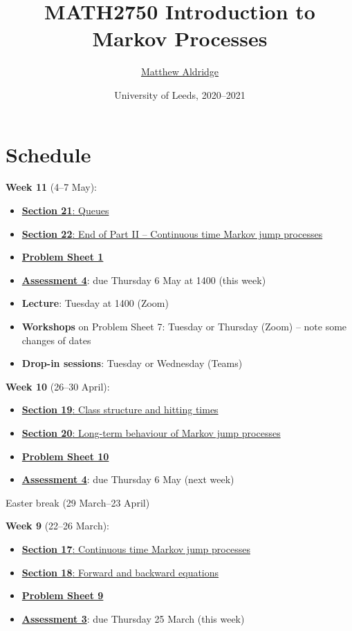 \documentclass[
  a4paper,
]{article}
\title{MATH2750 Introduction to Markov Processes}
\author{\href{mailto:m.aldridge@leeds.ac.uk}{Matthew Aldridge}}
\date{University of Leeds, 2020--2021}
\providecommand{\tightlist}{%
  \setlength{\itemsep}{0pt}\setlength{\parskip}{0pt}}
\theoremstyle{definition}
\theoremstyle{definition}
\theoremstyle{definition}
\theoremstyle{remark}
\begin{document}
\maketitle

{
\setcounter{tocdepth}{2}
\tableofcontents
}
\hypertarget{home}{%
\section*{Schedule}\label{home}}

\textbf{Week 11} (4--7 May):

\begin{itemize}
\tightlist
\item
  \protect\hyperlink{S21-queues}{\textbf{Section 21}: Queues}
\item
  \protect\hyperlink{S222-end}{\textbf{Section 22}: End of Part II -- Continuous time Markov jump processes}
\item
  \protect\hyperlink{P11}{\textbf{Problem Sheet 1}}
\item
  \protect\hyperlink{A4}{\textbf{Assessment 4}}: due Thursday 6 May at 1400 (this week)
\item
  \textbf{Lecture}: Tuesday at 1400 (Zoom)
\item
  \textbf{Workshops} on Problem Sheet 7: Tuesday or Thursday (Zoom) -- note some changes of dates
\item
  \textbf{Drop-in sessions}: Tuesday or Wednesday (Teams)
\end{itemize}

\textbf{Week 10} (26--30 April):

\begin{itemize}
\tightlist
\item
  \protect\hyperlink{S19-class-hitting}{\textbf{Section 19}: Class structure and hitting times}
\item
  \protect\hyperlink{S20-long-term-jump}{\textbf{Section 20}: Long-term behaviour of Markov jump processes}
\item
  \protect\hyperlink{P10}{\textbf{Problem Sheet 10}}
\item
  \protect\hyperlink{A4}{\textbf{Assessment 4}}: due Thursday 6 May (next week)
\end{itemize}

Easter break (29 March--23 April)

\textbf{Week 9} (22--26 March):

\begin{itemize}
\tightlist
\item
  \protect\hyperlink{S17-continuous-time}{\textbf{Section 17}: Continuous time Markov jump processes}
\item
  \protect\hyperlink{S18-forward-backward}{\textbf{Section 18}: Forward and backward equations}
\item
  \protect\hyperlink{P09}{\textbf{Problem Sheet 9}}
\item
  \protect\hyperlink{A3}{\textbf{Assessment 3}}: due Thursday 25 March (this week)
\end{itemize}
\end{document}
